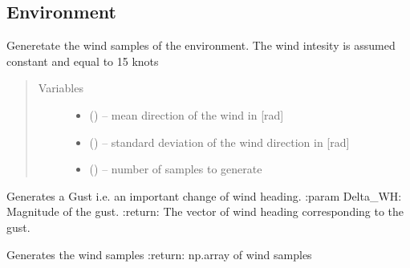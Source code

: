 \documentclass[letterpaper,10pt,english]{sphinxmanual}
\begin{document}
\subsection{Environment}
\label{\detokenize{package1:module-environment}}\label{\detokenize{package1:environment}}

\begin{fulllineitems}
\label{\detokenize{package1:environment.wind}}
Generetate the wind samples of the environment. The wind intesity is assumed constant and equal to 15 knots
\begin{quote}\begin{description}
\item[{Variables}] \leavevmode\begin{itemize}
\item {} 
 () -- mean direction of the wind in {[}rad{]}

\item {} 
 () -- standard deviation of the wind direction in {[}rad{]}

\item {} 
 () -- number of samples to generate

\end{itemize}

\end{description}\end{quote}

\begin{fulllineitems}
\label{\detokenize{package1:environment.wind.generateGust}}
Generates a Gust i.e. an important change of wind heading.
:param Delta\_WH: Magnitude of the gust.
:return: The vector of wind heading corresponding to the gust.

\end{fulllineitems}


\begin{fulllineitems}
\label{\detokenize{package1:environment.wind.generateWind}}
Generates the wind samples
:return: np.array of wind samples

\end{fulllineitems}


\end{fulllineitems}
\end{document}
